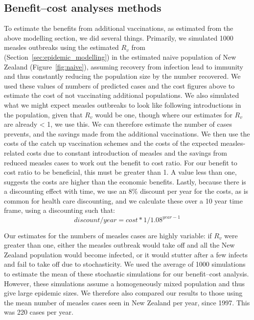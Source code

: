 \documentclass{article}
\begin{document}
\subsection{Benefit--cost analyses methods}
To estimate the benefits from additional vaccinations, as estimated from the above modelling section, we did several things. Primarily, we simulated 1000 measles outbreaks using the estimated $R_v$ from (Section~\ref{sec:epidemic_modelling}) in the estimated naive population of New Zealand (Figure~\ref{fig:naive}), assuming recovery from infection lead to immunity and thus constantly reducing the population size by the number recovered. We used these values of numbers of predicted cases and the cost figures above to estimate the cost of not vaccinating additional populations. We also simulated what we might expect measles outbreaks to look like following introductions in the population, given that $R_v$ would be one, though where our estimates for $R_v$ are already < 1, we use this. We can therefore estimate the number of cases prevents, and the savings made from the additional vaccinations. We then use the costs of the catch up vaccination schemes and the costs of the expected measles-related costs due to constant introduction of measles and the savings from reduced measles cases to work out the benefit to cost ratio. For our benefit to cost ratio to be beneficial, this must be greater than 1. A value less than one, suggests the costs are higher than the economic benefits. Lastly, because there is a discounting effect with time, we use an 8\% discount per year for the costs, as is common for health care discounting, and we calculate these over a 10 year time frame, using a discounting such that:
\begin{equation} \label{eq:reg}
discount/year = cost * 1/1.08^{year-1}
  \end{equation}

Our estimates for the numbers of measles cases are highly variable: if $R_v$ were greater than one, either the measles outbreak would take off and all the New Zealand population would become infected, or it would stutter after a few infects and fail to take off due to stochasticity. We used the average of 1000 simulations to estimate the mean of these stochastic simulations for our benefit--cost analysis. However, these simulations assume a homogeneously mixed population and thus give large epidemic sizes. We therefore also compared our results to those using the mean number of measles cases seen in New Zealand per year, since 1997. This was 220 cases per year.
\end{document}
